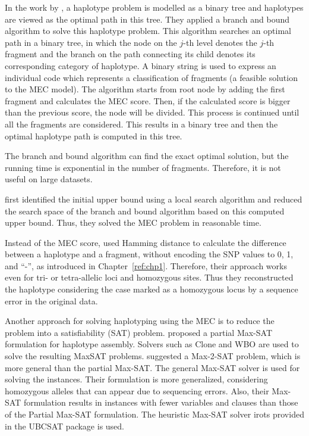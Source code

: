 In the work by \cite{wang2005haplotype}, a haplotype problem is modelled as a binary tree and haplotypes are viewed as the optimal path in this tree. 
They applied a branch
and bound algorithm to solve this haplotype problem. 
This algorithm searches an optimal path in a binary tree, in which
the node on the $j$-th level denotes the $j$-th fragment and the
branch on the path connecting its child denotes its
corresponding category of haplotype. 
A binary string is used to express an individual code which represents a classification of fragments (a feasible solution to the MEC model).
The algorithm starts from root node by adding the first fragment and calculates the MEC score. 
Then, if the calculated score is bigger than the previous score, the node will be divided. This process is continued until all the fragments are considered.
This results in a binary tree and then the optimal haplotype path is computed in this tree.


The branch and bound algorithm
can find the exact optimal solution, but the running time is exponential in the number of
fragments. Therefore, it is not useful on large datasets. 

\cite{lim2012individual} first identified the initial upper bound using a local search algorithm and 
reduced the search space of the branch and bound algorithm based on this computed upper bound.
Thus, they solved the MEC problem in reasonable time.

Instead of the MEC score, \cite{wang2012using} used Hamming distance to calculate the difference between a haplotype and a fragment, 
without encoding the SNP values to 0, 1, and ``-'', as introduced in Chapter~\ref{ref:chp1}. 
Therefore, their  approach works even for tri- or tetra-allelic loci and homozygous sites. 
Thus they reconstructed the haplotype considering the case marked as a homozygous locus by a sequence error in the original data. 

Another approach for solving haplotyping using the MEC is to reduce the problem into a satisfiability (SAT) problem. 
\cite{he2010optimal} proposed a partial Max-SAT formulation for haplotype assembly.
Solvers such as Clone and WBO are used to solve the resulting MaxSAT problems.
\cite{mousavi2011effective} suggested a Max-2-SAT problem,
which is more general than the partial Max-SAT. The general Max-SAT solver is used for solving the instances. Their formulation is more generalized, 
considering homozygous alleles that can appear due to sequencing errors.
Also, their Max-SAT formulation results in instances with fewer variables and clauses than those of the Partial Max-SAT formulation.
The heuristic Max-SAT solver irots provided in the UBCSAT package is used.

